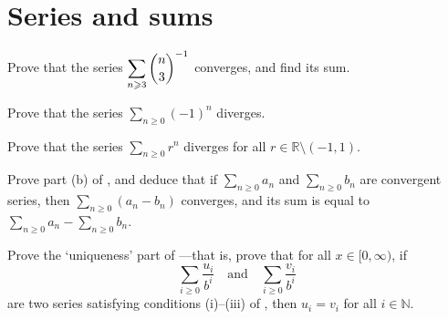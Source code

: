 \section{Series and sums}


\begin{exercise}
Prove that the series $\displaystyle \sum_{n \ge 3} \dbinom{n}{3}^{-1}$ converges, and find its sum.
\end{exercise}


\begin{exercise}
\label{exAlternatingSeriesOfOneDiverges}
Prove that the series $\sum_{n \ge 0} (-1)^n$ diverges.
\end{exercise}


\begin{exercise}
Prove that the series $\displaystyle \sum_{n \ge 0} r^n$ diverges for all $r \in \mathbb{R} \setminus (-1,1)$.
\end{exercise}


\begin{exercise}
Prove part (b) of , and deduce that if $\displaystyle \sum_{n \ge 0} a_n$ and $\displaystyle \sum_{n \ge 0} b_n$ are convergent series, then $\displaystyle \sum_{n \ge 0} (a_n - b_n)$ converges, and its sum is equal to $\displaystyle \sum_{n \ge 0} a_n - \sum_{n \ge 0} b_n$.
\end{exercise}


\begin{exercise}
Prove the `uniqueness' part of ---that is, prove that for all $x \in [0,\infty)$, if
\[ \sum_{i \ge 0} \dfrac{u_i}{b^i} \quad \text{and} \quad \sum_{i \ge 0} \dfrac{v_i}{b^i} \]
are two series satisfying conditions (i)--(iii) of , then $u_i=v_i$ for all $i \in \mathbb{N}$.
\end{exercise}


